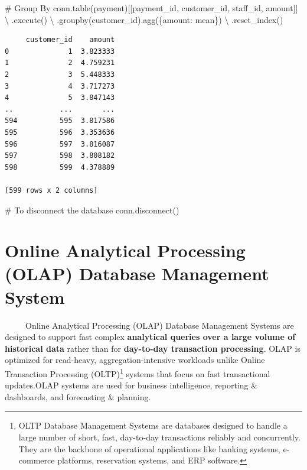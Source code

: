 \documentclass[
  letterpaper,
  DIV=11,
  numbers=noendperiod]{scrreprt}
\newenvironment{Shaded}{\begin{snugshade}}{\end{snugshade}}
\newcommand{\CommentTok}[1]{\textcolor[rgb]{0.37,0.37,0.37}{#1}}
\newcommand{\NormalTok}[1]{\textcolor[rgb]{0.00,0.23,0.31}{#1}}
\newcommand{\OperatorTok}[1]{\textcolor[rgb]{0.37,0.37,0.37}{#1}}
\newcommand{\StringTok}[1]{\textcolor[rgb]{0.13,0.47,0.30}{#1}}
\begin{document}
\begin{Shaded}
\begin{Highlighting}[]
\CommentTok{\# Group By}
\NormalTok{conn.table(}\StringTok{\textquotesingle{}payment\textquotesingle{}}\NormalTok{)[[}\StringTok{\textquotesingle{}payment\_id\textquotesingle{}}\NormalTok{, }\StringTok{\textquotesingle{}customer\_id\textquotesingle{}}\NormalTok{, }\StringTok{\textquotesingle{}staff\_id\textquotesingle{}}\NormalTok{, }\StringTok{\textquotesingle{}amount\textquotesingle{}}\NormalTok{]] }\OperatorTok{\textbackslash{}}
\NormalTok{    .execute() }\OperatorTok{\textbackslash{}}
\NormalTok{    .groupby(}\StringTok{\textquotesingle{}customer\_id\textquotesingle{}}\NormalTok{).agg(\{}\StringTok{\textquotesingle{}amount\textquotesingle{}}\NormalTok{: }\StringTok{\textquotesingle{}mean\textquotesingle{}}\NormalTok{\}) }\OperatorTok{\textbackslash{}}
\NormalTok{    .reset\_index() }
\end{Highlighting}
\end{Shaded}

\begin{verbatim}
     customer_id    amount
0              1  3.823333
1              2  4.759231
2              3  5.448333
3              4  3.717273
4              5  3.847143
..           ...       ...
594          595  3.817586
595          596  3.353636
596          597  3.816087
597          598  3.808182
598          599  4.378889

[599 rows x 2 columns]
\end{verbatim}

\begin{Shaded}
\begin{Highlighting}[]
\CommentTok{\# To disconnect the database }
\NormalTok{conn.disconnect()}
\end{Highlighting}
\end{Shaded}

\section{Online Analytical Processing (OLAP) Database Management
System}\label{online-analytical-processing-olap-database-management-system}

~~~~~Online Analytical Processing (OLAP) Database Management Systems are
designed to support fast complex \textbf{analytical queries over a large
volume of historical data} rather than for \textbf{day-to-day
transaction processing}. OLAP is optimized for read-heavy,
aggregation-intensive workloads unlike Online Transaction Processing
(OLTP)\footnote{OLTP Database Management Systems are databases designed
  to handle a large number of short, fast, day-to-day transactions
  reliably and concurrently. They are the backbone of operational
  applications like banking systems, e-commerce platforms, reservation
  systems, and ERP software.} systems that focus on fast transactional
updates.OLAP systems are used for business intelligence, reporting \&
dashboards, and forecasting \& planning.
\end{document}
